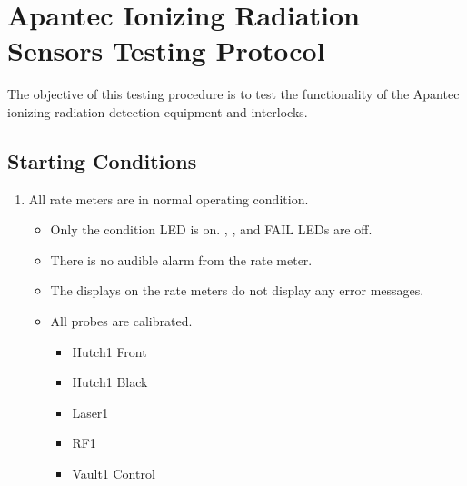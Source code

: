 \documentclass[letterpaper,10pt,english]{sphinxmanual}
\begin{document}
\sphinxstepscope


\section{Apantec Ionizing Radiation Sensors Testing Protocol}
\label{\detokenize{testing_documentation/apantec_testing:apantec-ionizing-radiation-sensors-testing-protocol}}\label{\detokenize{testing_documentation/apantec_testing::doc}}
\sphinxAtStartPar
The objective of this testing procedure is to test the functionality of the Apantec ionizing radiation detection equipment and interlocks.


\subsection{Starting Conditions}
\label{\detokenize{testing_documentation/apantec_testing:starting-conditions}}\begin{enumerate}
%
\item {} 
\sphinxAtStartPar
All rate meters are in normal operating condition.
\begin{itemize}
\item {} 
\sphinxAtStartPar
Only the  condition LED is on. , , and FAIL LEDs are off.

\item {} 
\sphinxAtStartPar
There is no audible alarm from the rate meter.

\item {} 
\sphinxAtStartPar
The displays on the rate meters do not display any error messages.

\item {} 
\sphinxAtStartPar
All probes are calibrated.
\begin{itemize}
\item {} 
\sphinxAtStartPar
Hutch\sphinxhyphen{}1 Front

\item {} 
\sphinxAtStartPar
Hutch\sphinxhyphen{}1 Black

\item {} 
\sphinxAtStartPar
Laser\sphinxhyphen{}1

\item {} 
\sphinxAtStartPar
RF\sphinxhyphen{}1

\item {} 
\sphinxAtStartPar
Vault\sphinxhyphen{}1 Control

\end{itemize}

\end{itemize}

\end{enumerate}
\end{document}
